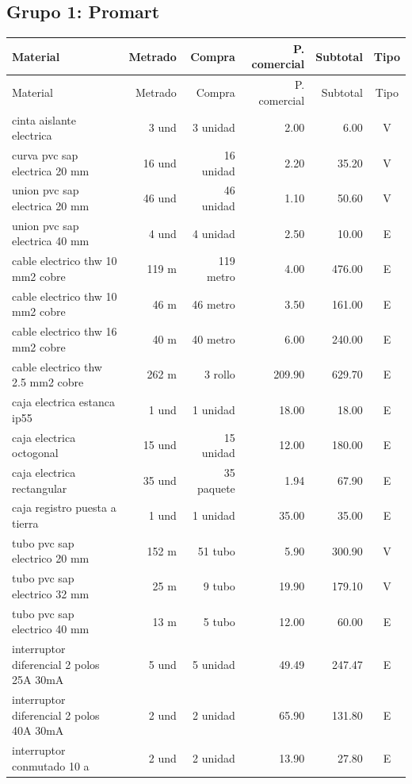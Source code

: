 \subsection{Grupo 1: Promart}
\begin{landscape}\scriptsize
\begin{longtable}{p{8.0cm}r r r r c}
\toprule Material & Metrado & Compra & P. comercial & Subtotal & Tipo \\ \midrule
\endfirsthead\toprule Material & Metrado & Compra & P. comercial & Subtotal & Tipo \\ \midrule\endhead
cinta aislante electrica & 3 und & 3 unidad & 2.00 & 6.00 & V \\
curva pvc sap electrica 20 mm & 16 und & 16 unidad & 2.20 & 35.20 & V \\
union pvc sap electrica 20 mm & 46 und & 46 unidad & 1.10 & 50.60 & V \\
union pvc sap electrica 40 mm & 4 und & 4 unidad & 2.50 & 10.00 & E \\
cable electrico thw 10 mm2 cobre & 119 m & 119 metro & 4.00 & 476.00 & E \\
cable electrico thw 10 mm2 cobre & 46 m & 46 metro & 3.50 & 161.00 & E \\
cable electrico thw 16 mm2 cobre & 40 m & 40 metro & 6.00 & 240.00 & E \\
cable electrico thw 2.5 mm2 cobre & 262 m & 3 rollo & 209.90 & 629.70 & E \\
caja electrica estanca ip55 & 1 und & 1 unidad & 18.00 & 18.00 & E \\
caja electrica octogonal & 15 und & 15 unidad & 12.00 & 180.00 & E \\
caja electrica rectangular & 35 und & 35 paquete & 1.94 & 67.90 & E \\
caja registro puesta a tierra & 1 und & 1 unidad & 35.00 & 35.00 & E \\
tubo pvc sap electrico 20 mm & 152 m & 51 tubo & 5.90 & 300.90 & V \\
tubo pvc sap electrico 32 mm & 25 m & 9 tubo & 19.90 & 179.10 & V \\
tubo pvc sap electrico 40 mm & 13 m & 5 tubo & 12.00 & 60.00 & E \\
interruptor diferencial 2 polos 25A 30mA & 5 und & 5 unidad & 49.49 & 247.47 & E \\
interruptor diferencial 2 polos 40A 30mA & 2 und & 2 unidad & 65.90 & 131.80 & E \\
interruptor conmutado 10 a & 2 und & 2 unidad & 13.90 & 27.80 & E \\

\end{longtable}
\end{landscape}
